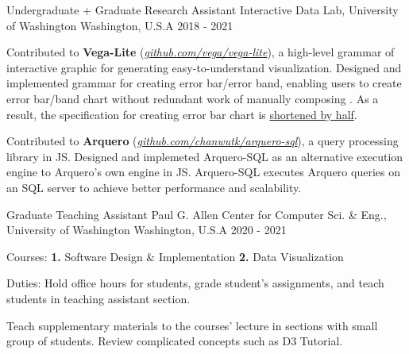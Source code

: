 \begin{cventries}
  \cvwork
    {Undergraduate + Graduate Research Assistant} %
    {Interactive Data Lab, University of Washington} %
    {Washington, U.S.A} %
    {2018 - 2021} %
    {
      \begin{cvitems} %
        \item {
          Contributed to \textbf{Vega-Lite} (\href{https://www.github.com/vega/vega-lite}{\textit{github.com/vega/vega-lite}}), a high-level grammar of interactive graphic for generating easy-to-understand visualization.
          Designed and implemented grammar for creating error bar/error band,
          enabling users to create error bar/band chart without  redundant work of manually composing .
          As a result, the specification for creating error bar chart is \underline{shortened by half}.
        }
        \item {
          Contributed to \textbf{Arquero} (\href{https://www.github.com/chanwutk/arquero-sql}{\textit{github.com/chanwutk/arquero-sql}}), a query processing library in JS.
          Designed and implemeted Arquero-SQL as an alternative execution engine to Arquero's own engine in JS.
          Arquero-SQL executes Arquero queries on an SQL server to achieve better performance and scalability.
        }
      \end{cvitems}
    }

  \cvwork
    {Graduate Teaching Assistant} %
    {Paul G. Allen Center for Computer Sci. \& Eng., University of Washington} %
    {Washington, U.S.A} %
    {2020 - 2021} %
    {
      \begin{cvitems} %
        \item {
          Courses: \textbf{1.} Software Design \& Implementation \textbf{2.} Data Visualization
        }
        \item {
          Duties: Hold office hours for students, grade student's assignments, and teach students in teaching assistant section.
        }
        \item {
          Teach supplementary materials to the courses' lecture in sections with small group of students. Review complicated concepts such as D3 Tutorial.
        }
      \end{cvitems}
    }


\end{cventries}
